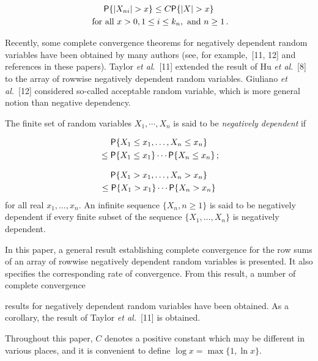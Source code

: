 \begin{multicols}{2}
\noindent
\begin{multline*}
{\sf P}\{|X_{ni}|>x\}\le C {\sf P}\{|X|>x\}\\ \mbox{ for all } x>0, 1\le i\le k_n, \mbox{ and } n\ge 1\,.
\end{multline*}

Recently, some complete convergence theorems for negatively dependent random variables have been obtained by
many authors (see, for example,~[11, 12] and references in
these papers). Taylor \textit{et al}.~[11] extended the result of Hu 
\textit{et al}.~[8] to the array of rowwise negatively
dependent random variables. Giuliano {\it et al.}~[12] considered so-called acceptable random variable, which
is more general notion than negative dependency.

The finite set of random variables $X_1, \cdots, X_n $ is said to be 
{\it negatively dependent} if

\noindent
\begin{multline*}
{\sf P}\{X_1\le x_1, \dots, X_n\le x_n\}\\
{} \le {\sf P}\{X_1\le x_1\} \cdots {\sf P}\{X_n\le x_n\}\,;
\end{multline*}

\vspace*{-12pt}

\noindent
\begin{multline*}
{\sf P}\{X_1> x_1, \dots, X_n> x_n\}\\ \le {\sf P}\{X_1> x_1\} \cdots
{\sf P}\{X_n> x_n\} 
\end{multline*}
for all real $x_1, \dots, x_n$. An infinite sequence $\{X_n, n\ge 1\}$ is said to be negatively dependent if every
finite subset of the sequence $\{X_1, \dots, X_n\}$ is negatively dependent.

In this paper, a general result establishing complete convergence for the row sums of an array of
rowwise negatively dependent random variables is presented. 
It also specifies the corresponding rate of convergence. From
this result, a number of complete convergence\linebreak\vspace*{-12pt}

\pagebreak

\noindent
 results for negatively dependent random variables
have been obtained. As a
corollary, the result of Taylor {\it et al.}~[11] is obtained.

Throughout this paper, $C$ denotes a positive constant which may be different in various places, and
it is convenient to define $\log x =\max\{1, \ln x\}$.


\end{multicols}
